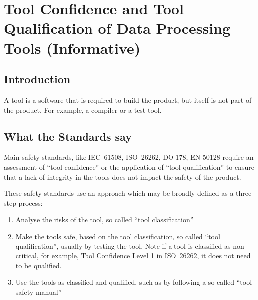 %
\chapter{Tool Confidence and Tool Qualification of Data Processing Tools (Informative)}\label{bkm:tools}
%

\section{Introduction}
A tool is a software that is required to build the product, but itself is not part of the product. For example, a compiler or a test tool.

\section{What the Standards say}
Main safety standards, like IEC\ 61508, ISO\ 26262, DO-178, EN-50128 require an assessment of ``tool confidence''
or the application of ``tool qualification'' to ensure that a lack of \gls{integrity} in the tools does not impact  the safety of the product. 

These safety standards use an approach which may be broadly defined as a three step process:

\begin{enumerate}
     \item Analyse the risks of the tool, so called ``tool classification''
     \item Make the tools safe, based on the tool classification, so called ``tool qualification'', usually by testing the tool.
       Note if a tool is classified as non-critical, for example, Tool Confidence Level 1 in ISO\ 26262, it does not need to be qualified.
     \item Use the tools as classified and qualified, such as by following a so called ``tool safety manual''
\end{enumerate}
 
